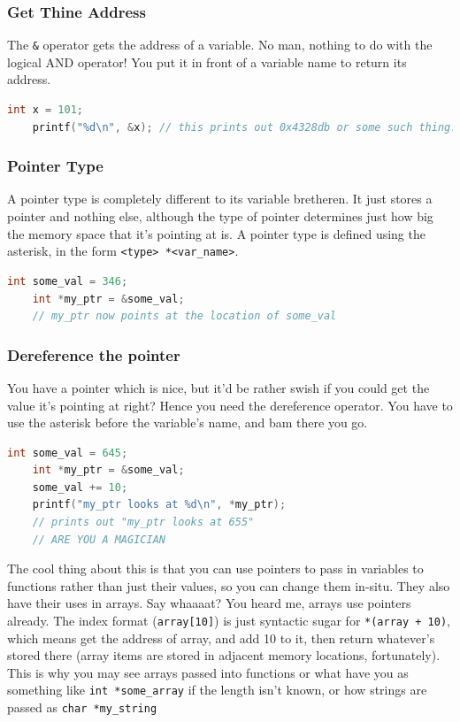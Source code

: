\subsubsection{Get Thine Address}
The \texttt{\&} operator gets the address of a variable. No man, nothing to do with the logical AND operator! You put it in front of a variable name to return its address.
\begin{lstlisting}[language=C]
    int x = 101;
    printf("%d\n", &x); // this prints out 0x4328db or some such thing.
\end{lstlisting}

\subsubsection{Pointer Type}
A pointer type is completely different to its variable bretheren. It just stores a pointer and nothing else, although the type of pointer determines just how big the memory space that it's pointing at is. A pointer type is defined using the asterisk, in the form \texttt{<type> *<var\_name>}.
\begin{lstlisting}[language=C]
    int some_val = 346;
    int *my_ptr = &some_val;
    // my_ptr now points at the location of some_val
\end{lstlisting}

\subsubsection{Dereference the pointer}
You have a pointer which is nice, but it'd be rather swish if you could get the value it's pointing at right? Hence you need the dereference operator. You have to use the asterisk before the variable's name, and bam there you go.
\begin{lstlisting}[language=C]
    int some_val = 645;
    int *my_ptr = &some_val;
    some_val += 10;
    printf("my_ptr looks at %d\n", *my_ptr);
    // prints out "my_ptr looks at 655"
    // ARE YOU A MAGICIAN
\end{lstlisting}

The cool thing about this is that you can use pointers to pass in variables to functions rather than just their values, so you can change them in-situ. They also have their uses in arrays. Say whaaaat? You heard me, arrays use pointers already. The index format (\texttt{array[10]}) is just syntactic sugar for \texttt{*(array + 10)}, which means get the address of array, and add 10 to it, then return whatever's stored there (array items are stored in adjacent memory locations, fortunately). This is why you may see arrays passed into functions or what have you as something like \texttt{int *some\_array} if the length isn't known, or how strings are passed as \texttt{char *my\_string}

